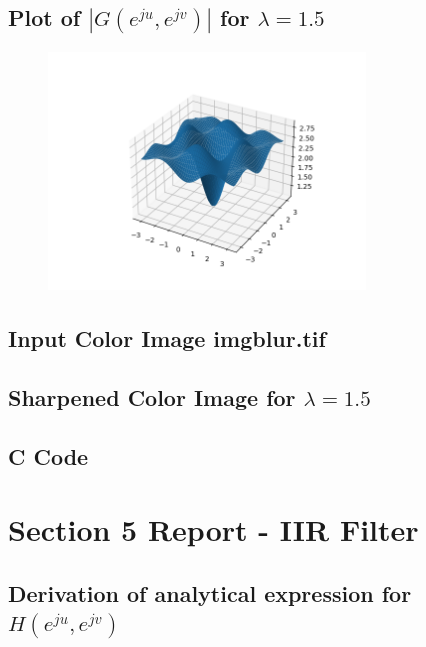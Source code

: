 \documentclass{article}
\begin{document}
\subsection{Plot of $|G(e^{ju}, e^{jv})|$ for $\lambda = 1.5$}
\begin{figure}[H]
    \centering
    \includegraphics[width=0.75\textwidth]{../results/section4-G-python.png}
    \begin{center}
    \end{center}
    \label{fig:A1}
\end{figure}
\subsection{Input Color Image imgblur.tif}
\subsection{Sharpened Color Image for $\lambda = 1.5$}
\subsection{C Code}


\section{Section 5 Report - IIR Filter}
\subsection{Derivation of analytical expression for $H(e^{ju}, e^{jv})$}
\end{document}
